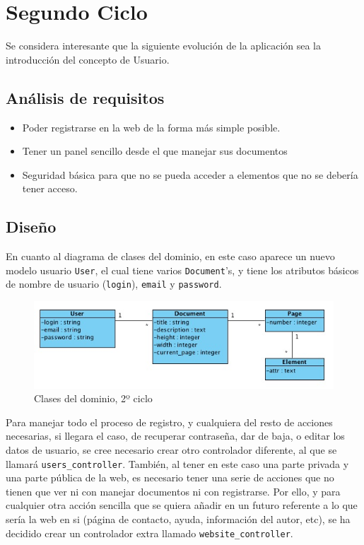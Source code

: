 \section{Segundo Ciclo} %
\label{sec:secundo_ciclo}

Se considera interesante que la siguiente evolución de la aplicación sea la introducción del concepto de Usuario.

\subsection{Análisis de requisitos} %
\label{sub:análisis_de_requisitos}

\begin{itemize}
  \item Poder registrarse en la web de la forma más simple posible.
  \item Tener un panel sencillo desde el que manejar sus documentos
  \item Seguridad básica para que no se pueda acceder a elementos que no se debería tener acceso.
\end{itemize}


\subsection{Diseño} %
\label{sub:diseño}

En cuanto al diagrama de clases del dominio, en este caso aparece un nuevo modelo usuario \texttt{User}, el cual tiene varios \texttt{Document}'s, y tiene los atributos básicos de nombre de usuario (\texttt{login}), \texttt{email} y \texttt{password}.

\begin{figure}[h!]
\centering
\includegraphics[width=15cm]{uml2.png}
\caption{Clases del dominio, 2º ciclo}\label{fig:uml2}
\end{figure}

Para manejar todo el proceso de registro, y cualquiera del resto de acciones necesarias, si llegara el caso, de recuperar contraseña, dar de baja, o editar los datos de usuario, se cree necesario crear otro controlador diferente, al que se llamará \texttt{users\_controller}. También, al tener en este caso una parte privada y una parte pública de la web, es necesario tener una serie de acciones que no tienen que ver ni con manejar documentos ni con registrarse. Por ello, y para cualquier otra acción sencilla que se quiera añadir en un futuro referente a lo que sería la web en si (página de contacto, ayuda, información del autor, etc), se ha decidido crear un controlador extra llamado \texttt{website\_controller}.

